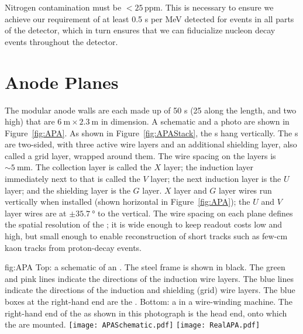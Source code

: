 Nitrogen contamination must be $<\!25$\,ppm. This is necessary to ensure we achieve our requirement of at least 0.5 \phel{}s per MeV detected for events in all parts of the detector, which in turn ensures %
that we can fiducialize nucleon decay events throughout the detector.

\section{Anode Planes}
\label{sec:exec-sp-apa}

The modular anode walls are each made up of 50 s (25 along the  length, and two high) that are $\SI{6}{\meter}\times\SI{2.3}{\meter}$ in dimension. A schematic and a photo are shown in Figure~\ref{fig:APA}. As shown in Figure~\ref{fig:APAStack}, the s hang vertically. The s are two-sided, with three active wire layers and an additional shielding layer, also called a grid layer, wrapped around them. The wire spacing on the layers is $\sim\!\SI{5}{\mm}$. The collection layer is called the $X$ layer; the induction layer immediately next to that is called the $V$ layer; the next induction layer is the $U$ layer; and the shielding layer is the $G$ layer. $X$ layer and $G$ layer wires run vertically when installed  (shown horizontal in Figure~\ref{fig:APA}); the $U$ and $V$ layer wires are at $\pm\SI{35.7}{\degree}$ to the vertical. The 
wire spacing on each plane defines the spatial resolution of the ; it is wide enough to keep readout costs low and  high, but small enough to enable reconstruction of 
short tracks such as few-\si{\cm} kaon tracks from proton-decay events.

\begin{dunefigure}{fig:APA}
{Top: a schematic of an . The steel  frame is shown in black. The green and pink lines indicate the directions of the induction wire layers. The blue lines indicate the directions of the induction and shielding (grid) wire layers. The blue boxes at the right-hand end  are the . Bottom: a   in a wire-winding machine. The right-hand end of the  as shown in this photograph is the head end, onto which the  are mounted.}
\texttt{[image: APASchematic.pdf]}
\texttt{[image: RealAPA.pdf]}
\end{dunefigure}

